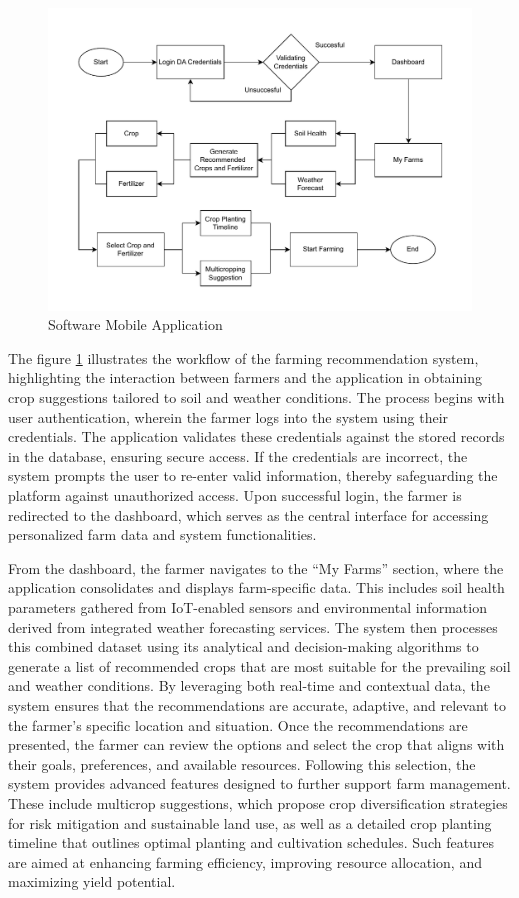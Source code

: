 {	\begin{figure}[H]
		\centering
		\caption{Software Mobile Application}
		\label{fig:MobileFlowchart}
		\includegraphics[width=1\textwidth]{figures/soft flow.pdf}
	\end{figure}
	
	The figure \ref{fig:MobileFlowchart} illustrates the workflow of the farming recommendation system, highlighting the interaction between farmers and the application in obtaining crop suggestions tailored to soil and weather conditions. The process begins with user authentication, wherein the farmer logs into the system using their credentials. The application validates these credentials against the stored records in the database, ensuring secure access. If the credentials are incorrect, the system prompts the user to re-enter valid information, thereby safeguarding the platform against unauthorized access. Upon successful login, the farmer is redirected to the dashboard, which serves as the central interface for accessing personalized farm data and system functionalities.
	
	From the dashboard, the farmer navigates to the “My Farms” section, where the application consolidates and displays farm-specific data. This includes soil health parameters gathered from IoT-enabled sensors and environmental information derived from integrated weather forecasting services. The system then processes this combined dataset using its analytical and decision-making algorithms to generate a list of recommended crops that are most suitable for the prevailing soil and weather conditions. By leveraging both real-time and contextual data, the system ensures that the recommendations are accurate, adaptive, and relevant to the farmer’s specific location and situation. Once the recommendations are presented, the farmer can review the options and select the crop that aligns with their goals, preferences, and available resources. Following this selection, the system provides advanced features designed to further support farm management. These include multicrop suggestions, which propose crop diversification strategies for risk mitigation and sustainable land use, as well as a detailed crop planting timeline that outlines optimal planting and cultivation schedules. Such features are aimed at enhancing farming efficiency, improving resource allocation, and maximizing yield potential.
	
}
